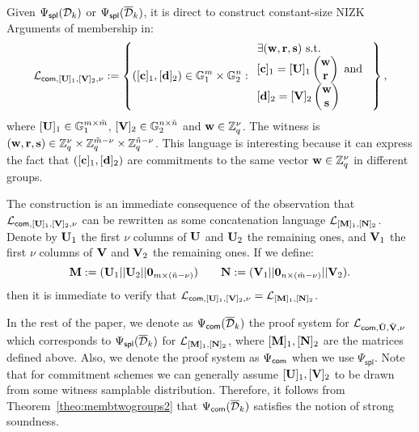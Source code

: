 Given ${\Psi_{\mathsf{spl}}(\mathcal{D}_k)}$ or ${\Psi_\mathsf{spl}(\overline{\mathcal{D}}_k)}$, it is direct to construct constant-size NIZK Arguments of membership in:
$$\mathcal{L}_{\mathsf{com},[\mathbf{{U}}]_1,[\mathbf{{V}}]_2,\nu}:=\left\{([\mathbf{c}]_1,[\mathbf{d}]_2) \in \mathbb{G}_1^{m} \times \mathbb{G}_2^{n}:
\begin{array}{l}
    \exists (\mathbf{w},\mathbf{r},\mathbf{s}) \text{ s.t. }\\
    {[\mathbf{c}]_1= [\mathbf{{U}}]_1 \begin{pmatrix} \mathbf{w}\\ \mathbf{r} \end{pmatrix} \text{ and }}\\
    {[\mathbf{d}]_2=[\mathbf{{V}}]_2 \begin{pmatrix} \mathbf{w} \\ \mathbf{s} \end{pmatrix}}
\end{array}
\right\},$$
where $[\mathbf{{U}}]_1\in \mathbb{G}_1^{m \times \tilde{m}}$, 
$[\mathbf{{V}}]_2 \in \mathbb{G}_2^{n \times \tilde{n}}$
and $\mathbf{w} \in \mathbb{Z}_q^{\nu}$. The witness is 
 $(\mathbf{w},\mathbf{r},\mathbf{s}) \in \mathbb{Z}_q^{\nu} \times \mathbb{Z}_q^{\tilde{m}-\nu} \times \mathbb{Z}_q^{\tilde{n}-\nu}$. This language is interesting because it can express the fact that 
$([\mathbf{c}]_1,[\mathbf{d}]_2)$ are commitments to the same vector 
$\mathbf{w} \in \mathbb{Z}_q^{\nu}$ in different groups.
 
The construction is an immediate consequence of the observation 
that $\mathcal{L}_{\mathsf{com},[\mathbf{{U}}]_1,[\mathbf{{V}}]_2,\nu}$  can be rewritten as some concatenation language $\mathcal{L}_{[\mathbf{{M}}]_1,[\mathbf{{N}}]_2}$.
Denote by $\mathbf{{U}}_1$ the first $\nu$ columns of $\mathbf{{U}}$  and $\mathbf{{U}}_2$ the remaining ones, and $\mathbf{{V}}_1$ the first $\nu$ columns of $\mathbf{{V}}$ and $\mathbf{{V}}_2$ the remaining ones. If we define: 
\begin{equation*}
 \mathbf{{M}} := (\mathbf{{U}}_1||\mathbf{{U}}_2||\mathbf{{0}}_{m\times (\tilde{n}-\nu)}) \qquad
\mathbf{{N}} := (\mathbf{{V}}_1||\mathbf{{0}}_{n\times (\tilde{m}- \nu)}||\mathbf{{V}}_2).
\end{equation*}
then it is immediate to verify that $\mathcal{L}_{\mathsf{com},[\mathbf{{U}}]_1,[\mathbf{{V}}]_2,\nu}=\mathcal{L}_{[\mathbf{{M}}]_1,[\mathbf{{N}}]_2}$.

In the rest of the paper, we denote as ${\Psi_{\mathsf{com}}(\overline{\mathcal{D}}_k)}$ the proof 
system for $\mathcal{L}_{\mathsf{com},{\hat{\mathbf{{U}}}},\check{\mathbf{{V}}},\nu}$ which corresponds to ${\Psi_\mathsf{spl}(\overline{\mathcal{D}}_k)}$ for $\mathcal{L}_{[\mathbf{{M}}]_1,[\mathbf{{N}}]_2}$, where $[\mathbf{{M}}]_1,[\mathbf{{N}}]_2$ are the matrices defined above. Also, we denote the proof system as $\Psi_{\mathsf{com}}$ when we use $\Psi_\mathsf{spl}$. Note that for commitment schemes we can generally assume $[\mathbf{{U}}]_1,[\mathbf{{V}}]_2$ to be drawn from some witness samplable distribution. Therefore, it follows from Theorem~\ref{theo:membtwogroups2} that ${\Psi_{\mathsf{com}}(\overline{\mathcal{D}}_k)}$ satisfies the notion of strong soundness.  
